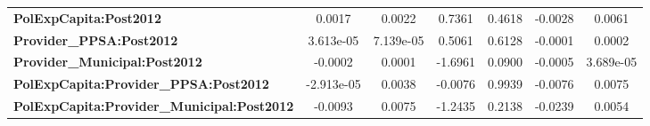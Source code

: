 \begin{center}
\begin{tabular}{lcccccc}
\textbf{PolExpCapita:Post2012}                     &       0.0017       &       0.0022       &      0.7361     &      0.4618      &      -0.0028      &       0.0061       \\
\textbf{Provider\_PPSA:Post2012}                   &     3.613e-05      &     7.139e-05      &      0.5061     &      0.6128      &      -0.0001      &       0.0002       \\
\textbf{Provider\_Municipal:Post2012}              &      -0.0002       &       0.0001       &     -1.6961     &      0.0900      &      -0.0005      &     3.689e-05      \\
\textbf{PolExpCapita:Provider\_PPSA:Post2012}      &     -2.913e-05     &       0.0038       &     -0.0076     &      0.9939      &      -0.0076      &       0.0075       \\
\textbf{PolExpCapita:Provider\_Municipal:Post2012} &      -0.0093       &       0.0075       &     -1.2435     &      0.2138      &      -0.0239      &       0.0054       \\
\bottomrule
\end{tabular}
\end{center}